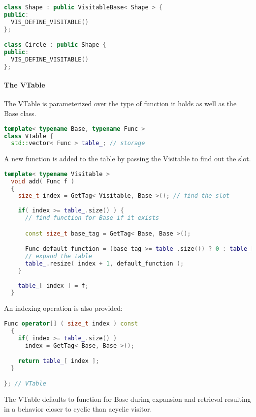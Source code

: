\documentclass{book}
\begin{document}
\begin{lstlisting}[caption={visitor pattern sample code 6-8},language=C++]
class Shape : public VisitableBase< Shape > {
public:
  VIS_DEFINE_VISITABLE()
};

class Circle : public Shape {
public:
  VIS_DEFINE_VISITABLE()
};
\end{lstlisting}

\paragraph{The VTable}

The VTable is parameterized over the type of function it holds as well as the Base class.

\begin{lstlisting}[caption={visitor pattern sample code 6-9},language=C++]
template< typename Base, typename Func >
class VTable {
  std::vector< Func > table_; // storage
\end{lstlisting}
A new function is added to the table by passing the Visitable to find out the slot.

\begin{lstlisting}[caption={visitor pattern sample code 6-9},language=C++]
  template< typename Visitable >
  void add( Func f )
  {
    size_t index = GetTag< Visitable, Base >(); // find the slot
  
    if( index >= table_.size() ) {
      // find function for Base if it exists

      const size_t base_tag = GetTag< Base, Base >();

      Func default_function = (base_tag >= table_.size()) ? 0 : table_[base_tag];
      // expand the table
      table_.resize( index + 1, default_function );
    }
  
    table_[ index ] = f;
  }
\end{lstlisting}
An indexing operation is also provided:

\begin{lstlisting}[caption={visitor pattern sample code 6-9},language=C++]
  Func operator[] ( size_t index ) const
  {
    if( index >= table_.size() )
      index = GetTag< Base, Base >();

    return table_[ index ];
  }

}; // VTable
\end{lstlisting}

The VTable defaults to function for Base during expansion and retrieval resulting in a behavior closer to cyclic than acyclic visitor.
\end{document}
